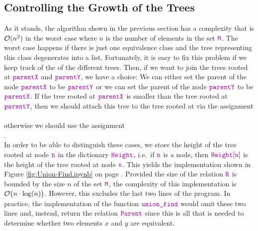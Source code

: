 \subsection{Controlling the Growth of the Trees}
As it stands, the algorithm shown in the previous section has a complexity that is $\mathcal{O}(n^2)$ in the
worst case where $n$ is the number of elements in the set $ \mytt{M}$.  The worst case happens if there
is just one equivalence class and the tree representing this class degenerates into a list.
Fortunately, it is easy to fix this problem if we keep track of the  of the
different trees.  Then, if we want to join the trees rooted at $\mytt{parentX}$ and
$\mytt{parentY}$, we have a choice: We can either set the parent of the node $\mytt{parentX}$ to
be $\mytt{parentY}$ or we can set the parent of the node $\mytt{parentY}$ to be $\mytt{parentX}$.
If the tree rooted at $\mytt{parentX}$ is smaller than the tree rooted at $\mytt{parentY}$, then we should
attach this tree to the tree rooted at  via the assignment
\\[0.2cm]
\hspace*{1.3cm}
\\[0.2cm]
otherwise we should use the assignment
\\[0.2cm]
\hspace*{1.3cm}
.
\\[0.2cm]
In order to be able to distinguish these cases, we store the height of the tree rooted at node
$\mytt{n}$ in the dictionary $\mytt{Height}$, i.e.~if $\mytt{n}$ is a node, then $\mytt{Height}[\mytt{n}]$ is
the height of the tree rooted at node $\mytt{n}$.  This yields the implementation shown in Figure
\ref{fig:Union-Find.ipynb} on page \pageref{fig:Union-Find.ipynb}.  Provided the size  of the relation
$\mytt{R}$ is bounded by the size $n$ of the set $ \mytt{M}$, the complexity of this
implementation is $\mathcal{O}\bigl(n \cdot \log(n)\bigr)$.  However, this excludes the last two lines of
the program.  In practice, the implementation of the function $\mytt{union\_find}$ would omit these
two lines and, instead, return the relation $\mytt{Parent}$ since this is all that is needed to
determine whether two elements $x$ and $y$ are equivalent. 

